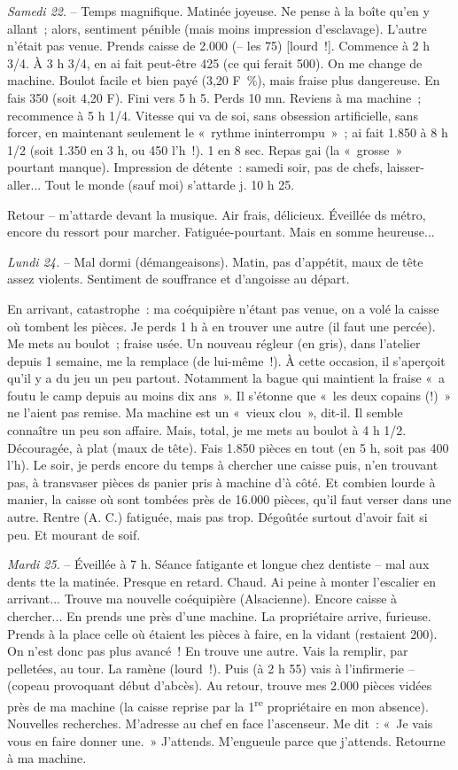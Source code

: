 \documentclass[french,twoside]{book} %
\begin{document}
{\itshape Samedi 22}. – Temps magnifique. Matinée joyeuse. Ne pense à la boîte qu'en y allant ; alors, sentiment pénible (mais moins impression d'esclavage). L'autre n'était pas venue. Prends caisse de 2.000 (– les 75) [lourd !]. Commence à 2 h 3/4. À 3 h 3/4, en ai fait peut-être 425 (ce qui ferait 500). On me change de machine. Boulot facile et bien payé (3,20 F \%), mais fraise plus dangereuse. En fais 350 (soit 4,20 F). Fini vers 5 h 5. Perds 10 mn. Reviens à ma machine ; recommence à 5 h 1/4. Vitesse qui va de soi, sans obsession artificielle, sans forcer, en maintenant seulement le « rythme ininterrompu » ; ai fait 1.850 à 8 h 1/2 (soit 1.350 en 3 h, ou 450 l’h !). 1 en 8 sec. Repas gai (la « grosse » pourtant manque). Impression de détente : samedi soir, pas de chefs, laisser-aller... Tout le monde (sauf moi) s'attarde j. 10 h 25.\par
Retour – m'attarde devant la musique. Air frais, délicieux. Éveillée ds métro, encore du ressort pour marcher. Fatiguée-pourtant. Mais en somme heureuse...\par
{\itshape Lundi 24.} – Mal dormi (démangeaisons). Matin, pas d'appétit, maux de tête assez violents. Sentiment de souffrance et d'angoisse au départ.\par
En arrivant, catastrophe : ma coéquipière n'étant pas venue, on a volé la caisse où tombent les pièces. Je perds 1 h à en trouver une autre (il faut une percée). Me mets au boulot ; fraise usée. Un nouveau régleur (en gris), dans l'atelier depuis 1 semaine, me la remplace (de lui-même !). À cette occasion, il s'aperçoit qu'il y a du jeu un peu partout. Notamment la bague qui maintient la fraise « a foutu le camp depuis au moins dix ans ». Il s'étonne que « les deux copains (!) » ne l'aient pas remise. Ma machine est un « vieux clou », dit-il. Il semble connaître un peu son affaire. Mais, total, je me mets au boulot à 4 h 1/2. Découragée, à plat (maux de tête). Fais 1.850 pièces en tout (en 5 h, soit pas 400 l'h). Le soir, je perds encore du temps à chercher une caisse puis, n'en trouvant pas, à transvaser pièces ds panier pris à machine d'à côté. Et combien lourde à manier, la caisse où sont tombées près de 16.000 pièces, qu'il faut verser dans une autre. Rentre (A. C.) fatiguée, mais pas trop. Dégoûtée surtout d'avoir fait si peu. Et mourant de soif.\par
{\itshape Mardi 25}. – Éveillée à 7 h. Séance fatigante et longue chez dentiste – mal aux dents tte la matinée. Presque en retard. Chaud. Ai peine à monter l'escalier en arrivant... Trouve ma nouvelle coéquipière (Alsacienne). Encore caisse à chercher... En prends une près d'une machine. La propriétaire arrive, furieuse. Prends à la place celle où étaient les pièces à faire, en la vidant (restaient 200). On n'est donc pas plus avancé ! En trouve une autre. Vais la remplir, par pelletées, au tour. La ramène (lourd !). Puis (à 2 h 55) vais à l'infirmerie – (copeau provoquant début d'abcès). Au retour, trouve mes 2.000 pièces vidées près de ma machine (la caisse reprise par la 1\textsuperscript{re} propriétaire en mon absence). Nouvelles recherches. M'adresse au chef en face l'ascenseur. Me dit : « Je vais vous en faire donner une. » J'attends. M'engueule parce que j'attends. Retourne à ma machine.\par
\end{document}
